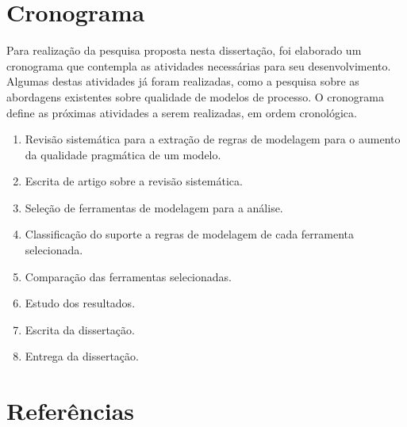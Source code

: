 \documentclass[12pt]{article}
\begin{document}
\newpage
\section{Cronograma}

Para realização da pesquisa proposta nesta dissertação, foi elaborado um cronograma que contempla as atividades necessárias para seu desenvolvimento. Algumas destas atividades já foram realizadas, como a pesquisa sobre as abordagens existentes sobre qualidade de modelos de processo. O cronograma define as próximas atividades a serem realizadas, em ordem cronológica.

\begin{enumerate}
	\item Revisão sistemática para a extração de regras de modelagem para o aumento da qualidade pragmática de um modelo.
	\item Escrita de artigo sobre a revisão sistemática.
	\item Seleção de ferramentas de modelagem para a análise.
	\item Classificação do suporte a regras de modelagem de cada ferramenta selecionada.
	\item Comparação das ferramentas selecionadas.
	\item Estudo dos resultados.
	\item Escrita da dissertação.
	\item Entrega da dissertação.
\end{enumerate}

\newpage
\section{Referências}


\end{document}
